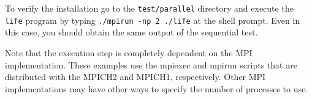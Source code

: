 To verify the installation go to the \verb"test/parallel"
directory and execute the \verb"life" program by typing
\verb"./mpirun -np 2 ./life" at the shell prompt. Even in this
case, you should obtain the same output of the sequential test.

Note that the execution step is completely dependent on the MPI
implementation. These examples use the mpiexec and mpirun scripts
that are distributed with the MPICH2 and MPICH1, respectively.
Other MPI implementations may have other ways to specify the
number of processes to use.
